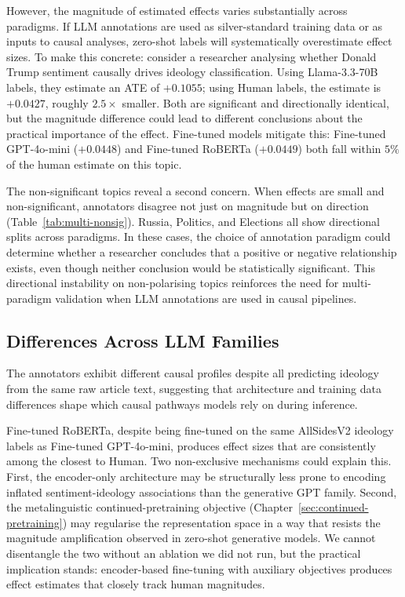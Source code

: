 However, the magnitude of estimated effects varies substantially across paradigms. If LLM annotations are used as silver-standard training data or as inputs to causal analyses, zero-shot labels will systematically overestimate effect sizes. To make this concrete: consider a researcher analysing whether Donald Trump sentiment causally drives ideology classification. Using Llama-3.3-70B labels, they estimate an ATE of $+0.1055$; using Human labels, the estimate is $+0.0427$, roughly $2.5\times$ smaller. Both are significant and directionally identical, but the magnitude difference could lead to different conclusions about the practical importance of the effect. Fine-tuned models mitigate this: Fine-tuned GPT-4o-mini ($+0.0448$) and Fine-tuned RoBERTa ($+0.0449$) both fall within $5\%$ of the human estimate on this topic.

The non-significant topics reveal a second concern. When effects are small and non-significant, annotators disagree not just on magnitude but on direction (Table~\ref{tab:multi-nonsig}). Russia, Politics, and Elections all show directional splits across paradigms. In these cases, the choice of annotation paradigm could determine whether a researcher concludes that a positive or negative relationship exists, even though neither conclusion would be statistically significant. This directional instability on non-polarising topics reinforces the need for multi-paradigm validation when LLM annotations are used in causal pipelines.

\subsection{Differences Across LLM Families}

The annotators exhibit different causal profiles despite all predicting ideology from the same raw article text, suggesting that architecture and training data differences shape which causal pathways models rely on during inference.

Fine-tuned RoBERTa, despite being fine-tuned on the same AllSidesV2 ideology labels as Fine-tuned GPT-4o-mini, produces effect sizes that are consistently among the closest to Human. Two non-exclusive mechanisms could explain this. First, the encoder-only architecture may be structurally less prone to encoding inflated sentiment-ideology associations than the generative GPT family. Second, the metalinguistic continued-pretraining objective (Chapter~\ref{sec:continued-pretraining}) may regularise the representation space in a way that resists the magnitude amplification observed in zero-shot generative models. We cannot disentangle the two without an ablation we did not run, but the practical implication stands: encoder-based fine-tuning with auxiliary objectives produces effect estimates that closely track human magnitudes.

